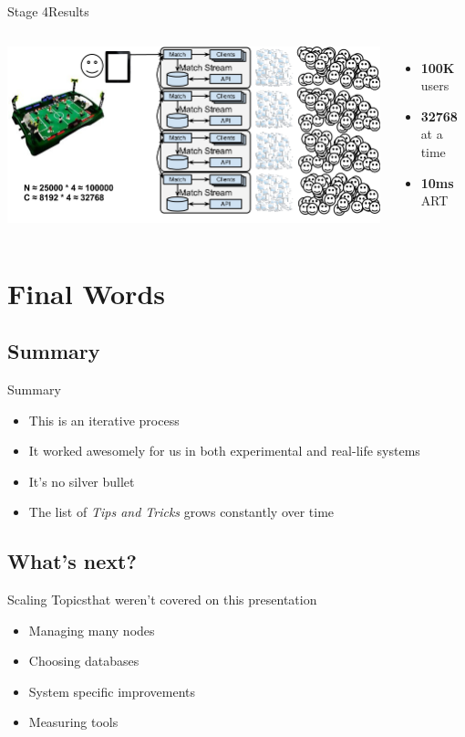 \documentclass[utf8]{beamer}
\begin{document}
\begin{frame}{Stage 4}{Results}
	\begin{columns}
			\includegraphics[top=-1,width=\textwidth]{img/MatchStream-4.png}
			\begin{itemize}
				\item \textbf{\Large 100K} users
				\item \textbf{\Large 32768} at a time
				\item \textbf{\Large 10ms} ART
			\end{itemize}
	\end{columns}
\end{frame}

\section{Final Words}
\subsection{Summary}
\begin{frame}{Summary}
	\begin{itemize}
		\item<+-> This is an \alert{iterative} process
		\item<+-> It worked awesomely for us in both experimental and real-life systems
		\item<+-> It's no \alert{silver bullet}
		\item<+-> The list of \emph{Tips and Tricks} grows \alert{constantly} over time
	\end{itemize}
\end{frame}
\subsection{What's next?}
\begin{frame}{Scaling Topics}{that weren't covered on this presentation}
	\begin{itemize}
		\item Managing many nodes
		\item Choosing databases
		\item System specific improvements
		\item Measuring tools
	\end{itemize}
\end{frame}
\end{document}
